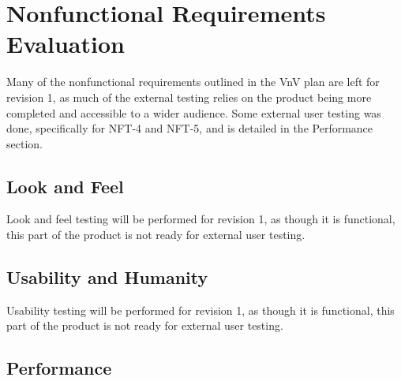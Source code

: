 \documentclass[12pt, titlepage]{article}
\begin{document}
\pagebreak

\section{Nonfunctional Requirements Evaluation}

Many of the nonfunctional requirements outlined in the VnV plan are left for revision 1, as much of the external testing relies on the product being more completed and accessible to a wider audience.
Some external user testing was done, specifically for NFT-4 and NFT-5, and is detailed in the Performance section.

\subsection{Look and Feel}

Look and feel testing will be performed for revision 1, as though it is functional, this part of the product is not ready for external user testing.
		
\subsection{Usability and Humanity}

Usability testing will be performed for revision 1, as though it is functional, this part of the product is not ready for external user testing.

\subsection{Performance}
\end{document}
